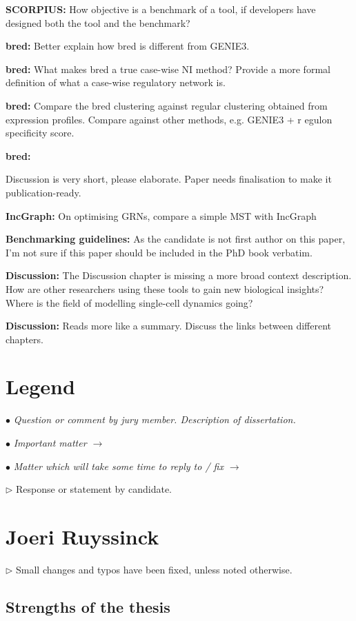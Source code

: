 \documentclass[10pt]{article}
\newcommand{\exam}[2][\  ]{\hspace{0pt}\marginpar{\color{red}#1}$\bullet$ \textit{#2}}
\newcommand{\imp}[1]{{\color{red} #1}}
\newcommand{\nimp}[1]{{\color{gray} #1}}
\newcommand{\answ}[1]{{\color{blue} $\triangleright$ #1}}
\newcommand{\bigexclaim}{\raisebox{-0.1em}{\BigTriangleUp}\hspace{-0.32em}\llap{\small\textbf{!}}\hspace{0.32em}}
\newcommand{\tagimp}{\bigexclaim}
\newcommand{\tagtime}{{\Large $\hourglass$}}
\begin{document}
{\textbf{SCORPIUS:} How objective is a benchmark of a tool, if developers have designed both the tool and the benchmark?

\textbf{bred:} {Better explain how bred is different from GENIE3.}

\textbf{bred:} {What makes bred a true case-wise NI method? Provide a more formal definition of what a case-wise regulatory network is.}

\textbf{bred:} {Compare the bred clustering against regular clustering obtained from expression profiles. Compare against other methods, e.g. GENIE3 + r	egulon specificity score.}

\textbf{bred:} {Discussion is very short, please elaborate. Paper needs finalisation to make it publication-ready.

\textbf{IncGraph:} {On optimising GRNs, compare a simple MST with IncGraph}

\textbf{Benchmarking guidelines:} {As the candidate is not first author on this paper, I’m not sure if this paper
	should be included in the PhD book verbatim.}

\textbf{Discussion:} {The Discussion chapter is missing a more broad context
			description. How are other researchers using these tools to gain new biological insights? Where is the field of modelling single-cell dynamics going?}
		
\textbf{Discussion:} {Reads more like a summary. Discuss the links between different chapters.}

\newpage
\section{Legend}
\exam{Question or comment by jury member. \nimp{Description of dissertation.}}

\exam[\tagimp]{\imp{Important matter} $\rightarrow$}

\exam[\tagtime]{Matter which will take some time to reply to / fix $\rightarrow$}

\answ{Response or statement by candidate.}


\section{Joeri Ruyssinck}

\answ{Small changes and typos have been fixed, unless noted otherwise.}

\subsection{Strengths of the thesis}

}}
\end{document}
